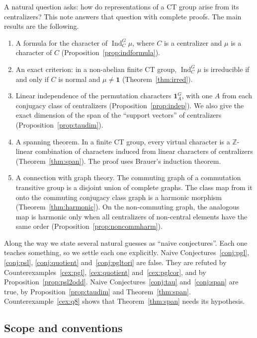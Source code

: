 \documentclass[12pt,letterpaper]{article}
\numberwithin{equation}{section}
\theoremstyle{plain}
\theoremstyle{definition}
\newcommand{\Z}{\mathbb{Z}}
\DeclareMathOperator{\Ind}{Ind}
\newcommand{\triv}{\mathbf{1}}
\begin{document}
A natural question asks: how do representations of a CT group arise from its
centralizers? This note answers that question with complete proofs. The
main results are the following.
\begin{enumerate}[itemsep=1pt]
\item A formula for the character of $\Ind_C^G\mu$, where $C$ is a
  centralizer and $\mu$ is a character of $C$
  (Proposition~\ref{prop:indformula}).
\item An exact criterion: in a non-abelian finite CT group, $\Ind_C^G\mu$ is
  irreducible if and only if $C$ is normal and $\mu\neq\triv$
  (Theorem~\ref{thm:irred}).
\item Linear independence of the permutation characters $\triv_A^G$, with
  one $A$ from each conjugacy class of centralizers
  (Proposition~\ref{prop:indep}). We also give the exact dimension of the
  span of the ``support vectors'' of centralizers
  (Proposition~\ref{prop:taudim}).
\item A spanning theorem. In a finite CT group, every virtual character is a
  $\Z$-linear combination of characters induced from linear characters of
  centralizers (Theorem~\ref{thm:span}). The proof uses Brauer's induction
  theorem.
\item A connection with graph theory. The commuting graph of a commutation
  transitive group is a disjoint union of complete graphs. The class map from
  it onto the commuting conjugacy class graph is a harmonic morphism
  (Theorem~\ref{thm:harmonic}). On the non-commuting graph, the analogous
  map is harmonic only when all centralizers of non-central elements have
  the same order (Proposition~\ref{prop:noncommharm}).
\end{enumerate}
Along the way we state several natural guesses as ``naive conjectures''.
Each one teaches something, so we settle each one explicitly.
Naive Conjectures~\ref{conj:pgl}, \ref{conj:psl}, \ref{conj:quotient}
and~\ref{conj:pgltori} are false. They are refuted by
Counterexamples~\ref{cex:pgl}, \ref{cex:quotient} and~\ref{cex:pglcor}, and by
Proposition~\ref{prop:psl2odd}. Naive Conjectures~\ref{conj:tau}
and~\ref{conj:span} are true, by Proposition~\ref{prop:taudim} and
Theorem~\ref{thm:span}. Counterexample~\ref{cex:q8} shows that
Theorem~\ref{thm:span} needs its hypothesis.

\subsection{Scope and conventions}
\end{document}
